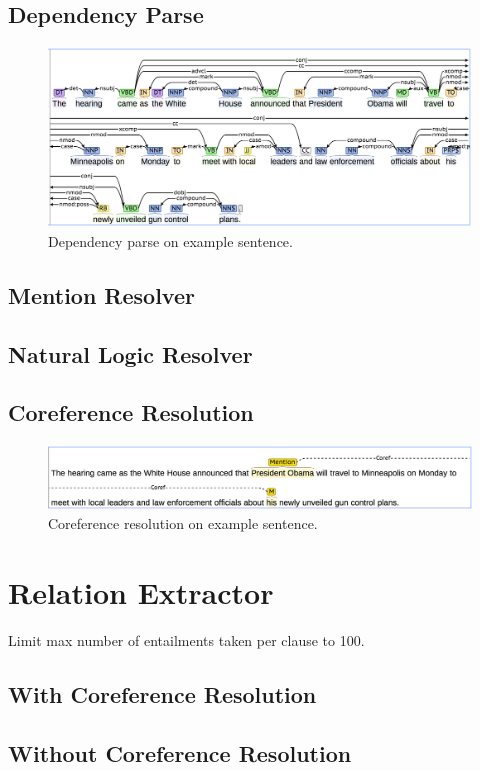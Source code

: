 \citet{finkel2005incorporating}
\subsection{Dependency Parse}

\begin{figure}
\includegraphics[scale=0.33]{figures/dep.png}
\caption{
\label{fig:dep}
Dependency parse on example sentence.
}
\end{figure}

\citet{chen2014nndep}
\subsection{Mention Resolver}

\subsection{Natural Logic Resolver}
\subsection{Coreference Resolution}

\begin{figure}
\includegraphics[scale=0.33]{figures/coref.png}
\caption{
\label{fig:coref}
Coreference resolution on example sentence.
}
\end{figure}

\citet{clark2015coref}

\section{Relation Extractor}
Limit max number of entailments taken per clause to 100.
\citet{angeli2015openie}
\citet{fader11reverb}

\subsection{With Coreference Resolution}

\subsection{Without Coreference Resolution}
